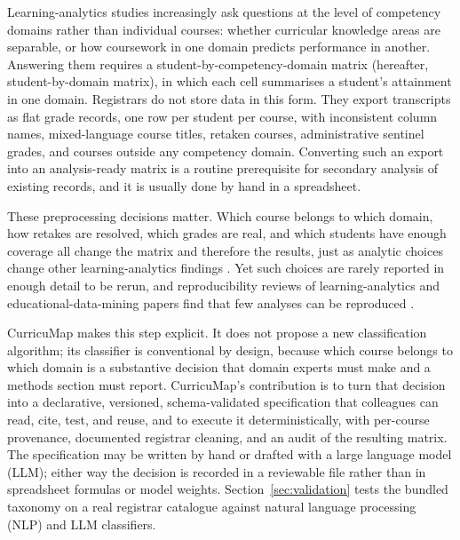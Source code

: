 \documentclass[preprint,12pt,a4paper]{elsarticle}
\begin{document}
Learning-analytics studies increasingly ask questions at the level of competency domains rather than individual courses: whether curricular knowledge areas are separable, or how coursework in one domain predicts performance in another. Answering them requires a student-by-competency-domain matrix (hereafter, student-by-domain matrix), in which each cell summarises a student's attainment in one domain. Registrars do not store data in this form. They export transcripts as flat grade records, one row per student per course, with inconsistent column names, mixed-language course titles, retaken courses, administrative sentinel grades, and courses outside any competency domain. Converting such an export into an analysis-ready matrix is a routine prerequisite for secondary analysis of existing records, and it is usually done by hand in a spreadsheet.

These preprocessing decisions matter. Which course belongs to which domain, how retakes are resolved, which grades are real, and which students have enough coverage all change the matrix and therefore the results, just as analytic choices change other learning-analytics findings \cite{kovanovic2015}. Yet such choices are rarely reported in enough detail to be rerun, and reproducibility reviews of learning-analytics and educational-data-mining papers find that few analyses can be reproduced \cite{haim2023lak,haim2023edm}.

CurricuMap makes this step explicit. It does not propose a new classification algorithm; its classifier is conventional by design, because which course belongs to which domain is a substantive decision that domain experts must make and a methods section must report. CurricuMap's contribution is to turn that decision into a declarative, versioned, schema-validated specification that colleagues can read, cite, test, and reuse, and to execute it deterministically, with per-course provenance, documented registrar cleaning, and an audit of the resulting matrix. The specification may be written by hand or drafted with a large language model (LLM); either way the decision is recorded in a reviewable file rather than in spreadsheet formulas or model weights. Section~\ref{sec:validation} tests the bundled taxonomy on a real registrar catalogue against natural language processing (NLP) and LLM classifiers.
\end{document}
